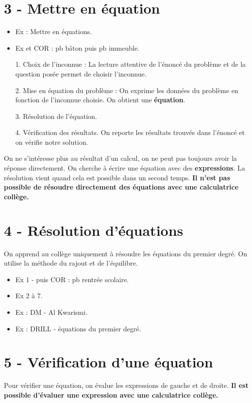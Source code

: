 \documentclass[11pt]{article}
\begin{document}
\section*{3 - Mettre en équation}

\begin{itemize}
  \item Ex : Mettre en équations.
  \item Ex et COR : pb bâton puis pb immeuble.   
\end{itemize}


\begin{enumerate}
  \item[1.] Choix de l'inconnue : La lecture attentive de l'énoncé du problème et de la question posée permet de choisir l'inconnue. 
  \item[2.] Mise en équation du problème : On exprime les données du problème en fonction de l'inconnue choisie. On obtient une \textbf{équation}.
  \item[3.] Résolution de l'équation.
  \item[4.] Vérification des résultats. On reporte les résultats trouvés dans l'énoncé et on vérifie notre solution.
\end{enumerate}

On ne s'intéresse plus au résultat d'un calcul, on ne peut pas toujours avoir la réponse directement. On cherche à écrire une équation avec des \textbf{expressions}. La résolution vient quand cela est possible dans un second temps. \textbf{Il n'est pas possible de résoudre directement des équations avec une calculatrice collège.}

\section*{4 - Résolution d'équations}

On apprend au collège uniquement à résoudre les équations du premier degré. On utilise la méthode du rajout et de l'équilibre.

\begin{itemize}
  \item Ex 1 - puis COR : pb rentrée scolaire.
  \item Ex 2 à 7.
  \item Ex : DM - Al Kwarismi. 
  \item Ex : DRILL - équations du premier degré.
\end{itemize}

\section*{5 - Vérification d'une équation}

Pour vérifier une équation, on évalue les expressions de gauche et de droite. \textbf{Il est possible d'évaluer une expression avec une calculatrice collège.}
\end{document}
